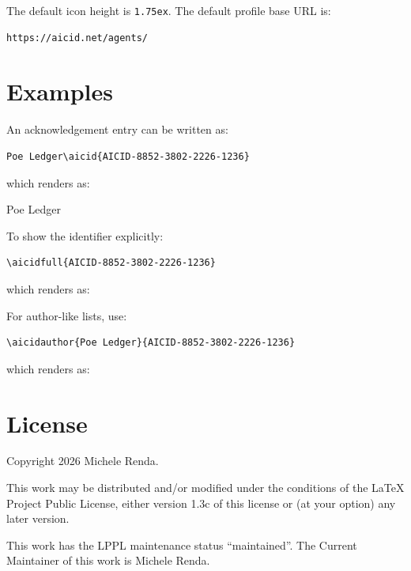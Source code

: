 \documentclass{article}
\begin{document}
The default icon height is \texttt{1.75ex}. The default profile base URL is:

\begin{verbatim}
https://aicid.net/agents/
\end{verbatim}

\section{Examples}

An acknowledgement entry can be written as:

\begin{verbatim}
Poe Ledger\aicid{AICID-8852-3802-2226-1236}
\end{verbatim}

which renders as:

\medskip

Poe Ledger

\medskip

To show the identifier explicitly:

\begin{verbatim}
\aicidfull{AICID-8852-3802-2226-1236}
\end{verbatim}

which renders as:

\medskip


\medskip

For author-like lists, use:

\begin{verbatim}
\aicidauthor{Poe Ledger}{AICID-8852-3802-2226-1236}
\end{verbatim}

which renders as:

\medskip


\section{License}

Copyright \textcopyright{} 2026 Michele Renda.

This work may be distributed and/or modified under the conditions of the
LaTeX Project Public License, either version 1.3c of this license or (at your
option) any later version.

This work has the LPPL maintenance status ``maintained''. The Current
Maintainer of this work is Michele Renda.
\end{document}

